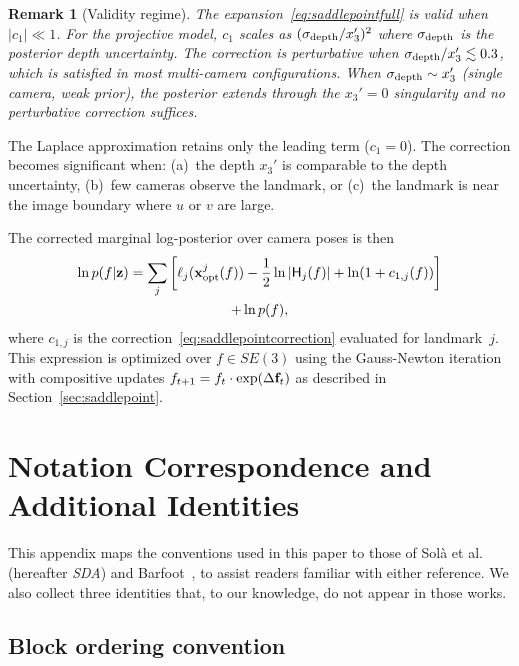 \documentclass[journal]{IEEEtran}
\newtheorem{remark}{Remark}
\begin{document}
\begin{remark}[Validity regime]
The expansion~\eqref{eq:saddlepointfull} is valid when $|c_1| \ll 1$.
For the projective model, $c_1$ scales as $(\sigma_{\rm depth}/x_3')^2$
where $\sigma_{\rm depth}$ is the posterior depth uncertainty.
The correction is perturbative when $\sigma_{\rm depth}/x_3' \lesssim 0.3$,
which is satisfied in most multi-camera configurations.
When $\sigma_{\rm depth} \sim x_3'$ (single camera, weak prior),
the posterior extends through the $x_3' = 0$ singularity
and no perturbative correction suffices.
\end{remark}

The Laplace approximation retains only the leading term 
($c_1 = 0$). The correction 
becomes significant when:
(a)~the depth $x_3'$ is comparable to the depth uncertainty,
(b)~few cameras observe the landmark, or
(c)~the landmark is near the image boundary where 
$u$ or $v$ are large.

The corrected marginal log-posterior over camera poses is then
\begin{multline}
    \ln p(f | {\bf z}) = \sum_j \left[\ell_j({\bf x}^j_{\rm opt}(f)) 
    - \frac{1}{2}\ln|\mathsf{H}_j(f)| + \ln(1 + c_{1,j}(f))\right]\\
    + \ln p(f),
    \label{eq:correctedmarginal}
\end{multline}
where $c_{1,j}$ is the correction~\eqref{eq:saddlepointcorrection}
evaluated for landmark~$j$.
This expression is optimized over $f \in SE(3)$ using the Gauss-Newton iteration 
with compositive updates $f_{t+1} = f_t \cdot \exp(\Delta{\bf f}_t)$ as described 
in Section~\ref{sec:saddlepoint}.


\section{Notation Correspondence and Additional Identities}
\label{app:correspondence}

This appendix maps the conventions used in this paper to those
of Sol\`{a} et al.~\cite{sola2018micro} (hereafter \emph{SDA}) and
Barfoot~\cite{barfoot2024}, to assist readers familiar with
either reference. We also collect three identities that, to our
knowledge, do not appear in those works.

\subsection{Block ordering convention}
\end{document}
